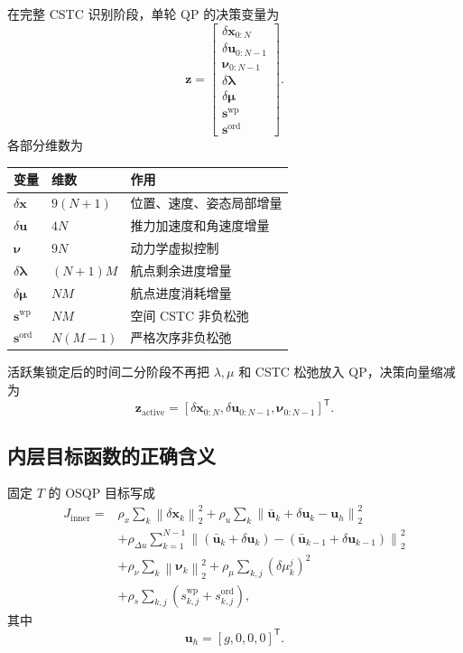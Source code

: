 \documentclass[UTF8,a4paper,11pt]{ctexart}
\newcommand{\trans}{^{\mathsf T}}
\newcommand{\normtwo}[1]{\left\lVert #1\right\rVert_2}
\begin{document}
在完整 CSTC 识别阶段，单轮 QP 的决策变量为
\begin{equation}
\bm z=
\begin{bmatrix}
  \delta\bm x_{0:N}\\
  \delta\bm u_{0:N-1}\\
  \bm\nu_{0:N-1}\\
  \delta\bm\lambda\\
  \delta\bm\mu\\
  \bm s^{\mathrm{wp}}\\
  \bm s^{\mathrm{ord}}
\end{bmatrix}.
\label{eq:decision-cstc}
\end{equation}
各部分维数为
\begin{center}
\begin{tabular}{lll}
\toprule
变量 & 维数 & 作用\\
\midrule
$\delta\bm x$ & $9(N+1)$ & 位置、速度、姿态局部增量\\
$\delta\bm u$ & $4N$ & 推力加速度和角速度增量\\
$\bm\nu$ & $9N$ & 动力学虚拟控制\\
$\delta\bm\lambda$ & $(N+1)M$ & 航点剩余进度增量\\
$\delta\bm\mu$ & $NM$ & 航点进度消耗增量\\
$\bm s^{\mathrm{wp}}$ & $NM$ & 空间 CSTC 非负松弛\\
$\bm s^{\mathrm{ord}}$ & $N(M-1)$ & 严格次序非负松弛\\
\bottomrule
\end{tabular}
\end{center}

活跃集锁定后的时间二分阶段不再把 $\lambda,\mu$ 和 CSTC 松弛放入 QP，决策向量缩减为
\begin{equation}
  \bm z_{\mathrm{active}}=
  [\delta\bm x_{0:N},\delta\bm u_{0:N-1},\bm\nu_{0:N-1}]\trans .
  \label{eq:decision-active}
\end{equation}

\subsection{内层目标函数的正确含义}

固定 $T$ 的 OSQP 目标写成
\begin{equation}
\begin{aligned}
J_{\mathrm{inner}}={}&
\rho_x\sum_k\normtwo{\delta\bm x_k}^2+
\rho_u\sum_k\normtwo{\bar{\bm u}_k+\delta\bm u_k-\bm u_h}^2\\
&+\rho_{\Delta u}\sum_{k=1}^{N-1}
\normtwo{
(\bar{\bm u}_k+\delta\bm u_k)-
(\bar{\bm u}_{k-1}+\delta\bm u_{k-1})
}^2\\
&+\rho_\nu\sum_k\normtwo{\bm\nu_k}^2+
\rho_\mu\sum_{k,j}(\delta\mu_k^j)^2\\
&+\rho_s\sum_{k,j}
\left(s_{k,j}^{\mathrm{wp}}+s_{k,j}^{\mathrm{ord}}\right),
\end{aligned}
\label{eq:inner-cost}
\end{equation}
其中
\begin{equation}
  \bm u_h=[g,0,0,0]\trans .
\end{equation}
\end{document}
